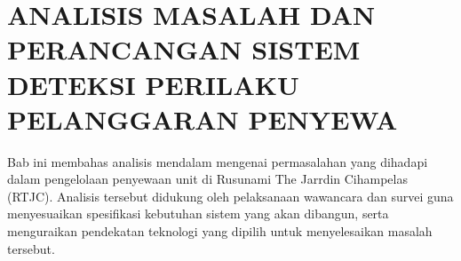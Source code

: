 \chapter{ANALISIS MASALAH DAN PERANCANGAN SISTEM DETEKSI PERILAKU PELANGGARAN PENYEWA}
\label{chap:analisis}

Bab ini membahas analisis mendalam mengenai permasalahan yang dihadapi dalam pengelolaan penyewaan unit di Rusunami The Jarrdin Cihampelas (RTJC). Analisis tersebut didukung oleh pelaksanaan wawancara dan survei guna menyesuaikan spesifikasi kebutuhan sistem yang akan dibangun, serta menguraikan pendekatan teknologi yang dipilih untuk menyelesaikan masalah tersebut.










